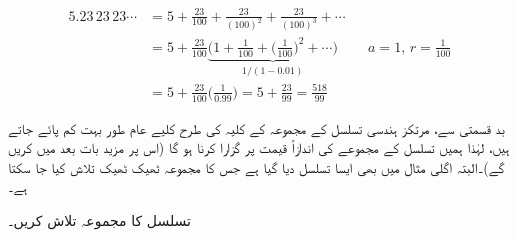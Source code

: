\begin{align*}
5.23\,23\,23\cdots&=5+\frac{23}{100}+\frac{23}{(100)^2}+\frac{23}{(100)^3}+\cdots\\
&=5+\frac{23}{100}\underbrace{\big(1+\frac{1}{100}+\big(\frac{1}{100}\big)^2+\cdots\big)}_{1/(1-0.01)}&&a=1,\, r=\tfrac{1}{100}\\
&=5+\frac{23}{100}\big(\frac{1}{0.99}\big)=5+\frac{23}{99}=\frac{518}{99}
\end{align*}

بد قسمتی سے، مرتکز ہندسی تسلسل کے مجموعہ کے کلیہ کی طرح کلیے  عام طور  بہت کم   پائے جاتے ہیں،  لہٰذا ہمیں تسلسل کے مجموعے کی اندازاً قیمت پر گزارا کرنا ہو گا (اس پر مزید بات  بعد میں کریں گے)۔البتہ اگلی مثال میں بھی ایسا تسلسل دیا گیا ہے جس کا   مجموعہ  ٹھیک ٹھیک تلاش کیا جا سکتا ہے۔

تسلسل  کا مجموعہ تلاش کریں۔

